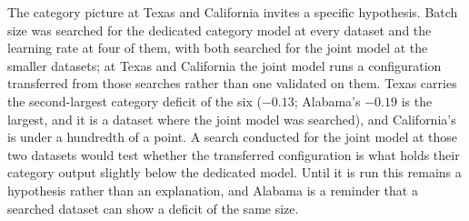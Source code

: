 The category picture at Texas and California invites a specific hypothesis. Batch size was searched
for the dedicated category model at every dataset and the learning rate at four of them, with both
searched for the joint model at the smaller datasets; at Texas and California the joint model runs a configuration transferred from
those searches rather than one validated on them. Texas carries the second-largest category deficit
of the six ($-0.13$; Alabama's $-0.19$ is the largest, and it is a dataset where the joint model was
searched), and California's is under a hundredth of a point. A search conducted for the joint model
at those two datasets would test whether the transferred configuration is what holds their category
output slightly below the dedicated model. Until it is run this remains a hypothesis rather than an
explanation, and Alabama is a reminder that a searched dataset can show a deficit of the same size.

